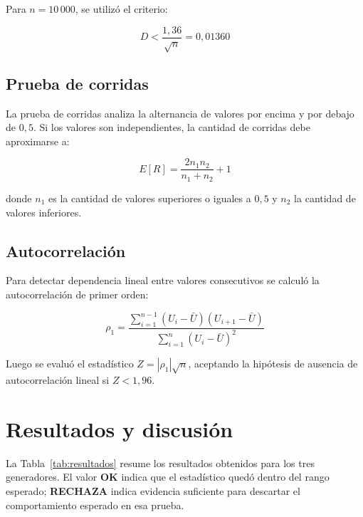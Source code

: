 \documentclass{article}
\begin{document}
Para $n = 10\,000$, se utilizó el criterio:

\begin{equation}
    D < \frac{1{,}36}{\sqrt{n}} = 0{,}01360
\end{equation}

\subsection{Prueba de corridas}

La prueba de corridas analiza la alternancia de valores por encima y por debajo
de $0{,}5$. Si los valores son independientes, la cantidad de corridas debe
aproximarse a:

\begin{equation}
    E[R] = \frac{2n_1n_2}{n_1+n_2} + 1
\end{equation}

\noindent donde $n_1$ es la cantidad de valores superiores o iguales a $0{,}5$ y
$n_2$ la cantidad de valores inferiores.

\subsection{Autocorrelación}

Para detectar dependencia lineal entre valores consecutivos se calculó la
autocorrelación de primer orden:

\begin{equation}
    \rho_1 =
    \frac{\sum_{i=1}^{n-1}(U_i-\bar{U})(U_{i+1}-\bar{U})}
    {\sum_{i=1}^{n}(U_i-\bar{U})^2}
\end{equation}

Luego se evaluó el estadístico $Z = |\rho_1|\sqrt{n}$, aceptando la hipótesis de
ausencia de autocorrelación lineal si $Z < 1{,}96$.

\section{Resultados y discusión}

La Tabla~\ref{tab:resultados} resume los resultados obtenidos para los tres
generadores. El valor \textbf{OK} indica que el estadístico quedó dentro del
rango esperado; \textbf{RECHAZA} indica evidencia suficiente para descartar el
comportamiento esperado en esa prueba.
\end{document}
